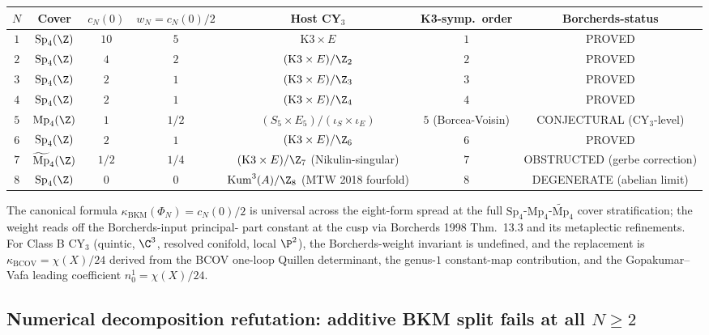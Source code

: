 \begin{center}\small
\begin{tabular}{ccc|cccc}
\toprule
$N$ & Cover & $c_N(0)$ & $w_N = c_N(0)/2$ &
  Host CY$_3$ & K3-symp.\ order & Borcherds-status \\
\midrule
$1$ & $\mathrm{Sp}_4(\Z)$ & $10$ & $5$ & $\mathrm{K3} \times E$ &
  $1$ & PROVED \\
$2$ & $\mathrm{Sp}_4(\Z)$ & $4$ & $2$ & $(\mathrm{K3}\times E)/\Z_2$ &
  $2$ & PROVED \\
$3$ & $\mathrm{Sp}_4(\Z)$ & $2$ & $1$ & $(\mathrm{K3}\times E)/\Z_3$ &
  $3$ & PROVED \\
$4$ & $\mathrm{Sp}_4(\Z)$ & $2$ & $1$ & $(\mathrm{K3}\times E)/\Z_4$ &
  $4$ & PROVED \\
$5$ & $\mathrm{Mp}_4(\Z)$ & $1$ & $1/2$ & $(S_5\times E_5)/(\iota_S
  \times \iota_E)$ & $5$ (Borcea-Voisin) & CONJECTURAL (CY$_3$-level) \\
$6$ & $\mathrm{Sp}_4(\Z)$ & $2$ & $1$ & $(\mathrm{K3}\times E)/\Z_6$ &
  $6$ & PROVED \\
$7$ & $\widetilde{\mathrm{Mp}}_4(\Z)$ & $1/2$ & $1/4$ &
  $(\mathrm{K3}\times E)/\Z_7$ (Nikulin-singular) &
  $7$ & OBSTRUCTED (gerbe correction) \\
$8$ & $\mathrm{Sp}_4(\Z)$ & $0$ & $0$ & $\mathrm{Kum}^3(A)/\Z_8$
  (MTW 2018 fourfold) & $8$ & DEGENERATE (abelian limit) \\
\bottomrule
\end{tabular}
\end{center}

The canonical formula $\kappa_{\mathrm{BKM}}(\Phi_N) = c_N(0)/2$ is
universal across the eight-form spread at the full
$\mathrm{Sp}_4$-$\mathrm{Mp}_4$-$\widetilde{\mathrm{Mp}}_4$ cover
stratification; the weight reads off the Borcherds-input principal-
part constant at the cusp via Borcherds 1998 Thm.~13.3 and its
metaplectic refinements. For Class B CY$_3$ (quintic, $\C^3$,
resolved conifold, local $\P^2$), the Borcherds-weight invariant
is undefined, and the replacement is
$\kappa_{\mathrm{BCOV}} = \chi(X)/24$ derived from the BCOV
one-loop Quillen determinant, the genus-$1$ constant-map
contribution, and the Gopakumar--Vafa leading coefficient
$n^1_0 = \chi(X)/24$.

\subsection*{Numerical decomposition refutation: additive BKM split
  fails at all $N \geq 2$}

